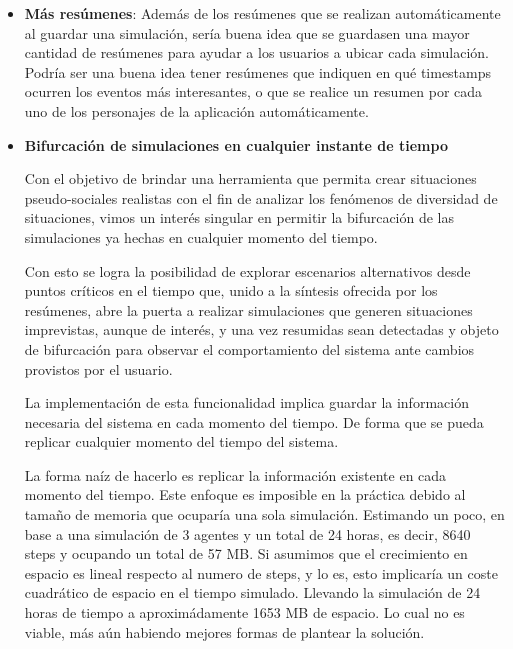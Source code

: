 \begin{itemize}
	\item \textbf{Más resúmenes}: Además de los resúmenes que se realizan automáticamente al guardar una simulación, sería buena idea que se guardasen una mayor cantidad de resúmenes para ayudar a los usuarios a ubicar cada simulación. Podría ser una buena idea tener resúmenes que indiquen en qué timestamps ocurren los eventos más interesantes, o que se realice un resumen por cada uno de los personajes de la aplicación automáticamente.

	\item\textbf{Bifurcación de simulaciones en cualquier instante de tiempo}

Con el objetivo de brindar una herramienta que permita crear situaciones pseudo-sociales realistas con el fin de analizar los fenómenos de diversidad de situaciones, vimos un interés singular en permitir la bifurcación de las simulaciones ya hechas en cualquier momento del tiempo.

Con esto se logra la posibilidad de explorar escenarios alternativos desde puntos críticos en el tiempo que, unido a la síntesis ofrecida por los resúmenes, abre la puerta a realizar simulaciones que generen situaciones imprevistas, aunque de interés, y una vez resumidas sean detectadas y objeto de bifurcación para observar el comportamiento del sistema ante cambios provistos por el usuario.

La implementación de esta funcionalidad implica guardar la información necesaria del sistema en cada momento del tiempo. De forma que se pueda replicar cualquier momento del tiempo del sistema. 

La forma naíz de hacerlo es replicar la información existente en cada momento del tiempo. Este enfoque es imposible en la práctica debido al tamaño de memoria que ocuparía una sola simulación. Estimando un poco, en base a una simulación de 3 agentes y un total de 24 horas, es decir, 8640 steps y ocupando un total de 57 MB. Si asumimos que el crecimiento en espacio es lineal respecto al numero de steps, y lo es, esto implicaría un coste cuadrático de espacio en el tiempo simulado. Llevando la simulación de 24 horas de tiempo a aproximádamente 1653 MB de espacio. Lo cual no es viable, más aún habiendo mejores formas de plantear la solución.	

\end{itemize}

